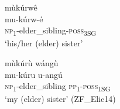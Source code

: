 \ea
\label{bkm:Ref436225558}
\glll mùkúrwê\\
mu-kúrw-é\\
\textsc{np}\textsubscript{1}-elder\_sibling-\textsc{poss}\textsubscript{3SG}\\
\glt ‘his/her (elder) sister’
\z

\ea
mùkúrù wángù\\
\gll mu-kúru    u-angú\\
\textsc{np}\textsubscript{1}-elder\_sibling  \textsc{pp}\textsubscript{1}-\textsc{poss}\textsubscript{1SG}\\
\glt ‘my (elder) sister’ (ZF\_Elic14)
\z
